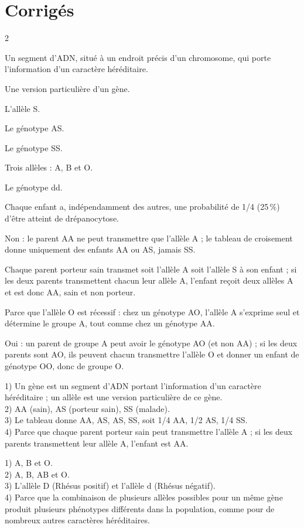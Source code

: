 \section{Corrigés}
\begin{multicols}{2}

Un segment d'ADN, situé à un endroit précis d'un chromosome, qui porte l'information
d'un caractère héréditaire.

Une version particulière d'un gène.

L'allèle S.

Le génotype AS.

Le génotype SS.

Trois allèles : A, B et O.

Le génotype dd.

Chaque enfant a, indépendamment des autres, une probabilité de 1/4 (25\,\%) d'être
atteint de drépanocytose.

Non : le parent AA ne peut transmettre que l'allèle A ; le tableau de croisement donne
uniquement des enfants AA ou AS, jamais SS.

Chaque parent porteur sain transmet soit l'allèle A soit l'allèle S à son enfant ; si
les deux parents transmettent chacun leur allèle A, l'enfant reçoit deux allèles A et
est donc AA, sain et non porteur.

Parce que l'allèle O est récessif : chez un génotype AO, l'allèle A s'exprime seul et
détermine le groupe A, tout comme chez un génotype AA.

Oui : un parent de groupe A peut avoir le génotype AO (et non AA) ; si les deux parents
sont AO, ils peuvent chacun transmettre l'allèle O et donner un enfant de génotype OO,
donc de groupe O.

1) Un gène est un segment d'ADN portant l'information d'un caractère héréditaire ; un
allèle est une version particulière de ce gène.\\
2) AA (sain), AS (porteur sain), SS (malade).\\
3) Le tableau donne AA, AS, AS, SS, soit 1/4 AA, 1/2 AS, 1/4 SS.\\
4) Parce que chaque parent porteur sain peut transmettre l'allèle A ; si les deux
parents transmettent leur allèle A, l'enfant est AA.

1) A, B et O.\\
2) A, B, AB et O.\\
3) L'allèle D (Rhésus positif) et l'allèle d (Rhésus négatif).\\
4) Parce que la combinaison de plusieurs allèles possibles pour un même gène produit
plusieurs phénotypes différents dans la population, comme pour de nombreux autres
caractères héréditaires.

\end{multicols}
\exercicesBanner
